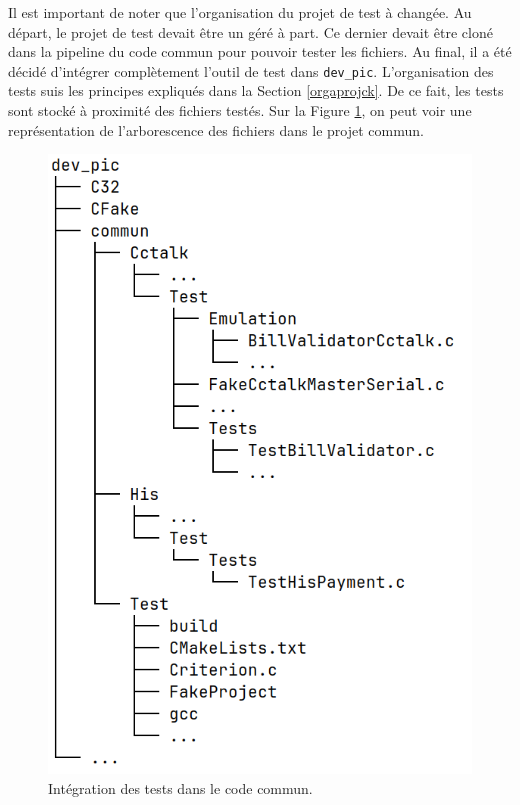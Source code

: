 \documentclass[a4paper]{article}
\begin{document}
Il est important de noter que l'organisation du projet de test à changée. Au
départ, le projet de test devait être un géré à part. Ce dernier devait être
cloné dans la pipeline du code commun pour pouvoir tester les fichiers. Au
final, il a été décidé d'intégrer complètement l'outil de test dans
\verb|dev_pic|. L'organisation des tests suis les principes expliqués dans la
Section \ref{orgaprojck}. De ce fait, les tests sont stocké à proximité des
fichiers testés. Sur la Figure \ref{fig:integrtestcommun}, on peut voir une
représentation de l'arborescence des fichiers dans le projet commun.


\begin{figure}[h!]
  \begin{center}
    \includegraphics[scale=0.4]{./img/arborescence-commun.png}
    \caption{Intégration des tests dans le code commun.}
    \label{fig:integrtestcommun}
  \end{center}
\end{figure}
\end{document}
